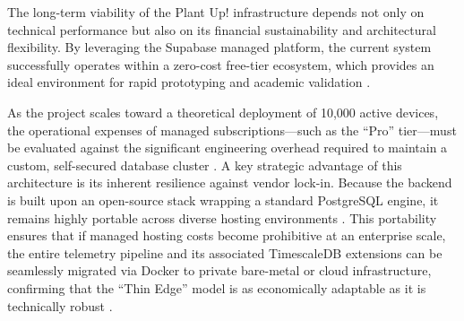 The long-term viability of the Plant Up! infrastructure depends not only on technical performance but also on its financial sustainability and architectural flexibility. By leveraging the Supabase managed platform, the current system successfully operates within a zero-cost free-tier ecosystem, which provides an ideal environment for rapid prototyping and academic validation \cite{supabase_home_2026}. 

As the project scales toward a theoretical deployment of 10,000 active devices, the operational expenses of managed subscriptions—such as the ``Pro'' tier—must be evaluated against the significant engineering overhead required to maintain a custom, self-secured database cluster \cite{supabase_postgresdb_2026, closefuture_supabase_firebase}. A key strategic advantage of this architecture is its inherent resilience against vendor lock-in. Because the backend is built upon an open-source stack wrapping a standard PostgreSQL engine, it remains highly portable across diverse hosting environments \cite{supabase_alternatives, blog_elest_supabase_self_host}. This portability ensures that if managed hosting costs become prohibitive at an enterprise scale, the entire telemetry pipeline and its associated TimescaleDB extensions can be seamlessly migrated via Docker to private bare-metal or cloud infrastructure, confirming that the ``Thin Edge'' model is as economically adaptable as it is technically robust \cite{elestSupabase}.
